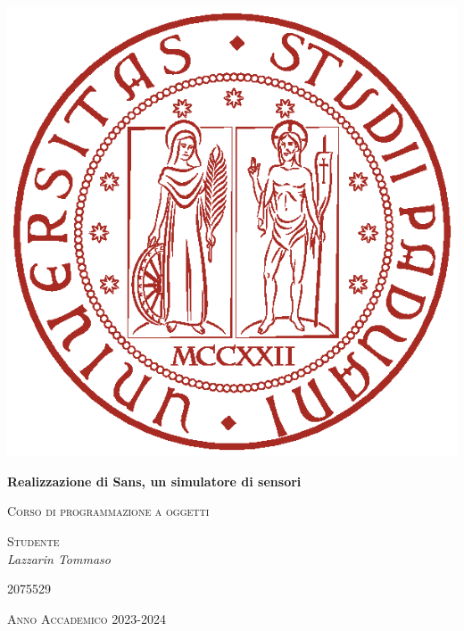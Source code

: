 \documentclass[a4paper]{article}
\begin{document}
\begin{titlepage}
    \centering
    \includegraphics{img/universita-degli-studi-di-padova.eps}
    {\huge\bfseries Realizzazione di Sans, un simulatore di sensori\par}
    \vspace{0.5cm}
	{\scshape\Large Corso di programmazione a oggetti\par}
	\vspace{1.5cm}
    {\raggedright \textsc{Studente} \\ \Large\itshape Lazzarin Tommaso\par}
    \vspace{0.1cm}
    {\raggedright\textsc{2075529}\par}
    \vfill
	{\large \textsc{Anno Accademico 2023-2024}}
\end{titlepage}
\clearpage
\tableofcontents
\clearpage
\end{document}
